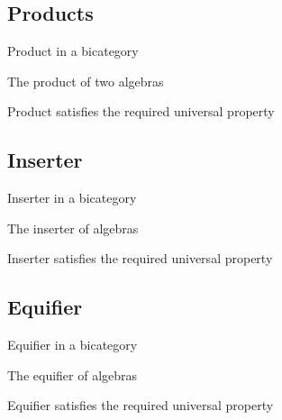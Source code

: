 \subsection{Products}

\begin{definition}
Product in a bicategory
\end{definition}

\begin{definition}
The product of two algebras
\end{definition}

\begin{proposition}
Product satisfies the required universal property
\end{proposition}

\subsection{Inserter}

\begin{definition}
Inserter in a bicategory
\end{definition}

\begin{definition}
The inserter of algebras
\end{definition}

\begin{proposition}
Inserter satisfies the required universal property
\end{proposition}

\subsection{Equifier}

\begin{definition}
Equifier in a bicategory
\end{definition}

\begin{definition}
The equifier of algebras
\end{definition}

\begin{proposition}
Equifier satisfies the required universal property
\end{proposition}